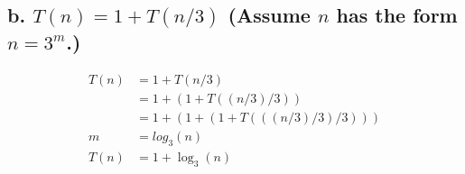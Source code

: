 \documentclass{article}
\begin{document}
\subsection*{b. \(T(n) = 1 + T(n/3)\) (Assume \(n\) has the form \(n = 3^m\).)}
\begin{subequations}
  \begin{align}
    T(n) &= 1 + T(n/3) \\
    &= 1 + (1 + T((n/3)/3)) \\
    &= 1 + (1 + (1 + T(((n/3)/3)/3))) \\
    m &= log_3(n) \\
    T(n) &= 1 + \log_{3}(n)
  \end{align}
\end{subequations}
\end{document}
